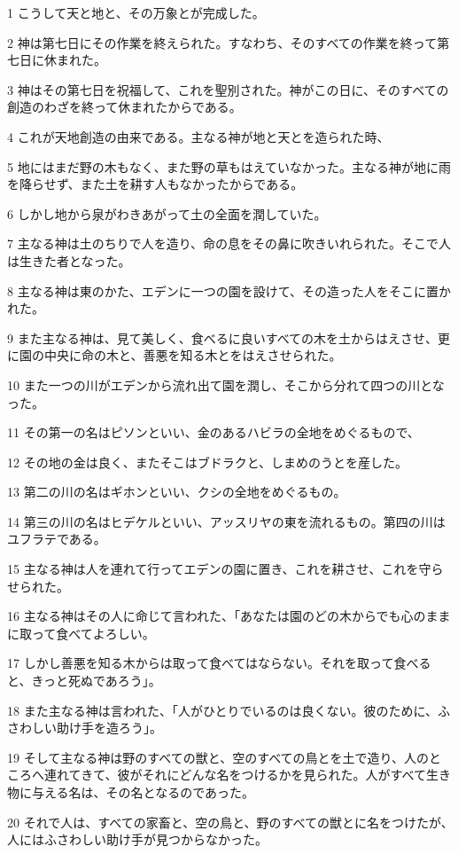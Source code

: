 \par 1 こうして天と地と、その万象とが完成した。
\par 2 神は第七日にその作業を終えられた。すなわち、そのすべての作業を終って第七日に休まれた。
\par 3 神はその第七日を祝福して、これを聖別された。神がこの日に、そのすべての創造のわざを終って休まれたからである。
\par 4 これが天地創造の由来である。主なる神が地と天とを造られた時、
\par 5 地にはまだ野の木もなく、また野の草もはえていなかった。主なる神が地に雨を降らせず、また土を耕す人もなかったからである。
\par 6 しかし地から泉がわきあがって土の全面を潤していた。
\par 7 主なる神は土のちりで人を造り、命の息をその鼻に吹きいれられた。そこで人は生きた者となった。
\par 8 主なる神は東のかた、エデンに一つの園を設けて、その造った人をそこに置かれた。
\par 9 また主なる神は、見て美しく、食べるに良いすべての木を土からはえさせ、更に園の中央に命の木と、善悪を知る木とをはえさせられた。
\par 10 また一つの川がエデンから流れ出て園を潤し、そこから分れて四つの川となった。
\par 11 その第一の名はピソンといい、金のあるハビラの全地をめぐるもので、
\par 12 その地の金は良く、またそこはブドラクと、しまめのうとを産した。
\par 13 第二の川の名はギホンといい、クシの全地をめぐるもの。
\par 14 第三の川の名はヒデケルといい、アッスリヤの東を流れるもの。第四の川はユフラテである。
\par 15 主なる神は人を連れて行ってエデンの園に置き、これを耕させ、これを守らせられた。
\par 16 主なる神はその人に命じて言われた、「あなたは園のどの木からでも心のままに取って食べてよろしい。
\par 17 しかし善悪を知る木からは取って食べてはならない。それを取って食べると、きっと死ぬであろう」。
\par 18 また主なる神は言われた、「人がひとりでいるのは良くない。彼のために、ふさわしい助け手を造ろう」。
\par 19 そして主なる神は野のすべての獣と、空のすべての鳥とを土で造り、人のところへ連れてきて、彼がそれにどんな名をつけるかを見られた。人がすべて生き物に与える名は、その名となるのであった。
\par 20 それで人は、すべての家畜と、空の鳥と、野のすべての獣とに名をつけたが、人にはふさわしい助け手が見つからなかった。
